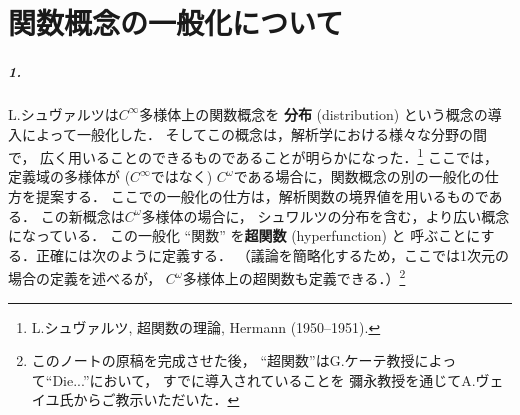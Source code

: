 \section{関数概念の一般化について}

\subparagraph{1.}
L.シュヴァルツは\(C^\infty\)多様体上の関数概念を
\textbf{分布} (distribution) という概念の導入によって一般化した．
そしてこの概念は，解析学における様々な分野の間で，
広く用いることのできるものであることが明らかになった．\footnote{
    L.シュヴァルツ, 超関数の理論, Hermann (1950--1951).
}
ここでは，定義域の多様体が (\(C^\infty\)ではなく) 
\(C^\omega\)である場合に，関数概念の別の一般化の仕方を提案する．
ここでの一般化の仕方は，解析関数の境界値を用いるものである．
この新概念は\(C^\omega\)多様体の場合に，
シュワルツの分布を含む，より広い概念になっている．
この一般化 ``関数'' を\textbf{超関数} (hyperfunction) と
呼ぶことにする．正確には次のように定義する．
（議論を簡略化するため，ここでは1次元の場合の定義を述べるが，
\(C^\omega\)多様体上の超関数も定義できる．）\footnote{
    このノートの原稿を完成させた後，
    ``超関数''はG.ケーテ教授によって``Die...''において，
    すでに導入されていることを
    彌永教授を通じてA.ヴェイユ氏からご教示いただいた．
}
